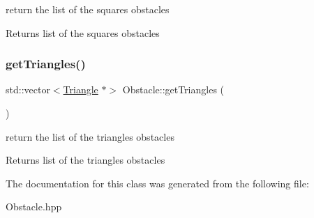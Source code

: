 return the list of the squares obstacles \begin{DoxyReturn}{Returns}
list of the squares obstacles 
\end{DoxyReturn}
\mbox{\label{class_obstacle_ae4541d52e558b0995203e99d09d4d5d6}} 
\subsubsection{\texorpdfstring{get\+Triangles()}{getTriangles()}}
{\footnotesize\ttfamily std\+::vector$<$\mbox{\hyperlink{class_geometry2_d_1_1_triangle}{Triangle}} $\ast$$>$ Obstacle\+::get\+Triangles (\begin{DoxyParamCaption}{ }\end{DoxyParamCaption})}

return the list of the triangles obstacles \begin{DoxyReturn}{Returns}
list of the triangles obstacles 
\end{DoxyReturn}


The documentation for this class was generated from the following file\+:\begin{DoxyCompactItemize}
\item 
Obstacle.\+hpp\end{DoxyCompactItemize}
